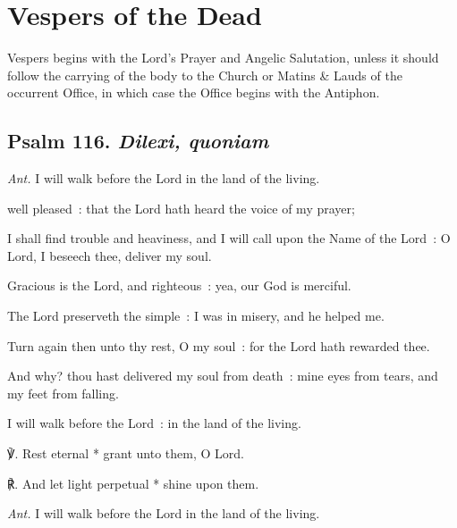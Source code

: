 \section{Vespers of the Dead}
\begin{secrubric}
Vespers begins with the Lord's Prayer and Angelic Salutation, unless it should follow the carrying of the body to the Church or Matins \& Lauds of the occurrent Office, in which case the Office begins with the Antiphon.
\end{secrubric}

\vspace{-0.25\baselineskip}

\subsection{Psalm 116. \textit{Dilexi, quoniam}}\par\noindent
\textit{Ant.} I will walk {\dag} before the Lord in the land of the living.\par
{} well pleased~: that the Lord hath heard the voice of my prayer;\par
{}
I shall find trouble and heaviness, and I will call upon the Name of the Lord~: O Lord, I beseech thee, deliver my soul.\par
{}Gracious is the Lord, and righteous~: yea, our God is merciful.\par
{}The Lord preserveth the simple~: I was in misery, and he helped me.\par
{}Turn again then unto thy rest, O my soul~: for the Lord hath rewarded thee.\par
{}And why? thou hast delivered my soul from death~: mine eyes from tears, and my feet from falling.\par
{}I will walk before the Lord~: in the land of the living.
\par
℣. Rest eternal * grant unto them, O Lord.\par
℟. And let light perpetual * shine upon them.\par\noindent
\textit{Ant.} I will walk before the Lord in the land of the living.
